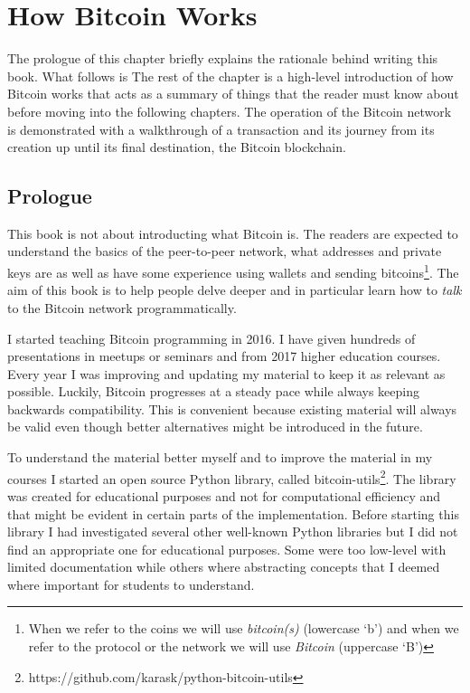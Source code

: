 \chapter{How Bitcoin Works}

\begin{summary}
The prologue of this chapter briefly explains the rationale behind writing this book. What follows is The rest of the chapter is a high-level introduction of how Bitcoin works that acts as a summary of things that the reader must know about before moving into the following chapters. The operation of the Bitcoin network is demonstrated with a walkthrough of a transaction and its journey from its creation up until its final destination, the Bitcoin blockchain.
\end{summary}

\section{Prologue}
This book is not about introducting what Bitcoin is. The readers are expected to understand the basics of the peer-to-peer network, what addresses and private keys are as well as have some experience using wallets and sending bitcoins\footnote{When we refer to the coins we will use \emph{bitcoin(s)} (lowercase `b') and when we refer to the protocol or the network we will use \emph{Bitcoin} (uppercase `B')}. The aim of this book is to help people delve deeper and in particular learn how to \emph{talk} to the Bitcoin network programmatically.

I started teaching Bitcoin programming in 2016. I have given hundreds of presentations in meetups or seminars and from 2017 higher education courses. Every year I was improving and updating my material to keep it as relevant as possible. Luckily, Bitcoin progresses at a steady pace while always keeping backwards compatibility. This is convenient because existing material will always be valid even though better alternatives might be introduced in the future.
  
To understand the material better myself and to improve the material in my courses I started an open source Python library, called bitcoin-utils\footnote{https://github.com/karask/python-bitcoin-utils}. The library was created for educational purposes and not for computational efficiency and that might be evident in certain parts of the implementation. Before starting this library I had investigated several other well-known Python libraries but I did not find an appropriate one for educational purposes. Some were too low-level with limited documentation while others where abstracting concepts that I deemed where important for students to understand.

